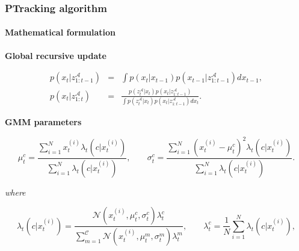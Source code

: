 \begin{frame}
\begin{columns}
		{
		}
		
		{
			\vspace{-0.7cm}
		}
	\end{columns}
\end{frame}

\begin{frame}
	\frametitle{PTracking algorithm}
	\framesubtitle{Mathematical formulation}
	
	\vspace{0.4cm}
	
	\textbf{Global recursive update}
	
	\vspace{-0.4cm}
	
	\begin{eqnarray*}
	p(x_t|z_{1:t-1}^\mathcal{A}) &=& \int p(x_t|x_{t-1}) p(x_{t-1}|z_{1:t-1}^\mathcal{A})dx_{t-1}, \\
	p(x_t|z_{1:t}^\mathcal{A}) &=& \frac{p(z_t^\mathcal{A}|x_t) p(x_t|z_{1:t-1}^\mathcal{A})}{\int p(z_t^\mathcal{A}|x_t)p(x_t|z_{1:t-1}^\mathcal{A})dx_t}.
	\end{eqnarray*}
	
	\textbf{GMM parameters}
	
	\vspace{-0.1cm}
	
	\begin{equation*}
		\mu_t^c = \frac{\sum_{i=1}^N x_t^{(i)}\lambda_t(c|x_t^{(i)})}{\sum_{i=1}^N \lambda_t(c|x_t^{(i)})},\;\;\;\;\;\;\;
		\sigma_t^c = \frac{\sum_{i=1}^N (x_t^{(i)} - \mu_t^c)^2\lambda_t(c|x_t^{(i)}) }{\sum_{i=1}^N \lambda_t(c|x_t^{(i)}) }.
	\end{equation*}
	
	\emph{where}
	
	\vspace{-0.5cm}
	
	\begin{equation*}
		\lambda_t(c|x_t^{(i)}) = \frac{\mathcal{N}(x_t^{(i)},\mu_t^c,\sigma_t^c)\lambda_t^c} {\sum_{m=1}^{\mathcal{C}}\mathcal{N}(x_t^{(i)},\mu_t^m,\sigma_t^m)\lambda_t^m},\;\;\;\;\;\;\;
		\lambda_t^c = \frac{1}{N} \sum_{i=1}^N \lambda_t(c|x_t^{(i)}),
	\end{equation*}
\end{frame}

